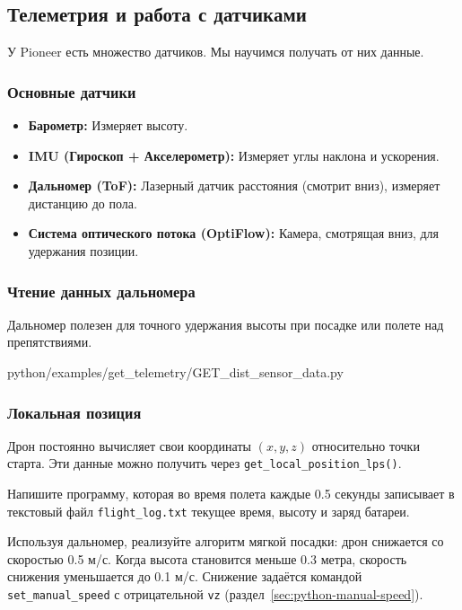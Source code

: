 \subsection{Телеметрия и работа с датчиками}

У Pioneer есть множество датчиков. Мы научимся получать от них данные.

\subsubsection*{Основные датчики}
\begin{itemize}
    \item \textbf{Барометр:} Измеряет высоту.
    \item \textbf{IMU (Гироскоп + Акселерометр):} Измеряет углы наклона и ускорения.
    \item \textbf{Дальномер (ToF):} Лазерный датчик расстояния (смотрит вниз), измеряет дистанцию до пола.
    \item \textbf{Система оптического потока (OptiFlow):} Камера, смотрящая вниз, для удержания позиции.
\end{itemize}

\subsubsection*{Чтение данных дальномера}
Дальномер полезен для точного удержания высоты при посадке или полете над препятствиями.

\begin{codefile}[python]{python/examples/get_telemetry/GET_dist_sensor_data.py}
\end{codefile}

\subsubsection*{Локальная позиция}
Дрон постоянно вычисляет свои координаты $(x, y, z)$ относительно точки старта. Эти данные можно получить через \texttt{get\_local\_position\_lps()}.

\begin{taskbox}
Напишите программу, которая во время полета каждые 0.5 секунды записывает в текстовый файл \texttt{flight\_log.txt} текущее время, высоту и заряд батареи.
\end{taskbox}

\begin{taskbox}
Используя дальномер, реализуйте алгоритм мягкой посадки: дрон снижается со скоростью 0.5 м/с. Когда высота становится меньше 0.3 метра, скорость снижения уменьшается до 0.1 м/с. Снижение задаётся командой \verb|set_manual_speed| с отрицательной \verb|vz| (раздел~\ref{sec:python-manual-speed}).
\end{taskbox}
